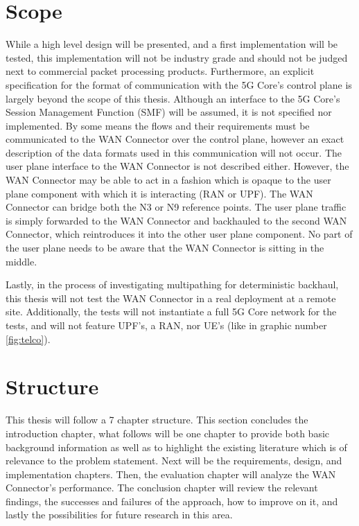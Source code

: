 \section{Scope}
\label{sec:scope}

While a high level design will be presented, and a first implementation will be tested, this implementation will not be industry grade and should not be judged next to commercial packet processing products.  Furthermore, an explicit specification for the format of communication with the 5G Core's control plane is largely beyond the scope of this thesis. Although an interface to the 5G Core's Session Management Function (SMF) will be assumed, it is not specified nor implemented. By some means the flows and their requirements must be communicated to the WAN Connector over the control plane, however an exact description of the data formats used in this communication will not occur. The user plane interface to the WAN Connector is not described either. However, the WAN Connector may be able to act in a fashion which is opaque to the user plane component with which it is interacting (RAN or UPF). The WAN Connector can bridge both the N3 or N9 reference points. The user plane traffic is simply forwarded to the WAN Connector and backhauled to the second WAN Connector, which reintroduces it into the other user plane component. No part of the user plane needs to be aware that the WAN Connector is sitting in the middle.

Lastly, in the process of investigating multipathing for deterministic backhaul, this thesis will not test the WAN Connector in a real deployment at a remote site. Additionally, the tests will not instantiate a full 5G Core network for the tests, and will not feature UPF's, a RAN, nor UE's (like in graphic number \ref{fig:telco}).

\section{Structure}

This thesis will follow a 7 chapter structure. This section concludes the introduction chapter, what follows will be one chapter to provide both basic background information as well as to highlight the existing literature which is of relevance to the problem statement. Next will be the requirements, design, and implementation chapters. Then, the evaluation chapter will analyze the WAN Connector's performance. The conclusion chapter will review the relevant findings, the successes and failures of the approach, how to improve on it, and lastly the possibilities for future research in this area.



\nocite{tsai2006review}
\nocite{rodriguez2004mar}
\nocite{tarique2009survey}
\nocite{tao2004application}
\nocite{zand2012wireless}
\nocite{li2016multipath}
